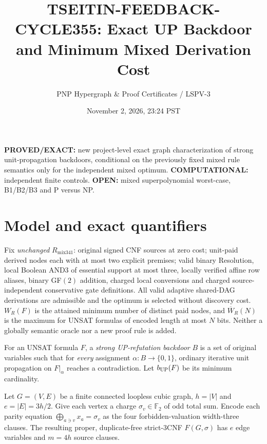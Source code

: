 \documentclass[11pt]{article}
\title{TSEITIN-FEEDBACK-CYCLE355: Exact UP Backdoor and Minimum Mixed Derivation Cost}
\author{PNP Hypergraph \& Proof Certificates / LSPV-3}
\date{November 2, 2026, 23:24 PST}
\begin{document}
\maketitle
\noindent\textbf{PROVED/EXACT:} new project-level exact graph characterization of strong unit-propagation backdoors, conditional on the previously fixed mixed rule semantics only for the independent mixed optimum. \textbf{COMPUTATIONAL:} independent finite controls. \textbf{OPEN:} mixed superpolynomial worst-case, B1/B2/B3 and P versus NP.

\section*{Model and exact quantifiers}
Fix \emph{unchanged} $R_{\mathrm{mix341}}$: original signed CNF sources at zero cost; unit-paid derived nodes each with at most two explicit premises; valid binary Resolution, local Boolean AND3 of essential support at most three, locally verified affine row aliases, binary GF$(2)$ addition, charged local conversions and charged source-independent conservative gate definitions. All valid adaptive shared-DAG derivations are admissible and the optimum is selected without discovery cost. $W_R(F)$ is the attained minimum number of distinct paid nodes, and $\overline W_R(N)$ is the maximum for UNSAT formulas of encoded length at most $N$ bits. Neither a globally semantic oracle nor a new proof rule is added.

For an UNSAT formula $F$, a \emph{strong UP-refutation backdoor} $B$ is a set of original variables such that for \emph{every} assignment $\alpha:B\to\{0,1\}$, ordinary iterative unit propagation on $F|_\alpha$ reaches a contradiction. Let $b_{\rm UP}(F)$ be its minimum cardinality.

Let $G=(V,E)$ be a finite connected loopless cubic graph, $h=|V|$ and $e=|E|=3h/2$. Give each vertex a charge $\sigma_v\in\mathbb F_2$ of odd total sum. Encode each parity equation $\bigoplus_{a\ni v}x_a=\sigma_v$ as the four forbidden-valuation width-three clauses. The resulting proper, duplicate-free strict-3CNF $F(G,\sigma)$ has $e$ edge variables and $m=4h$ source clauses.
\end{document}
